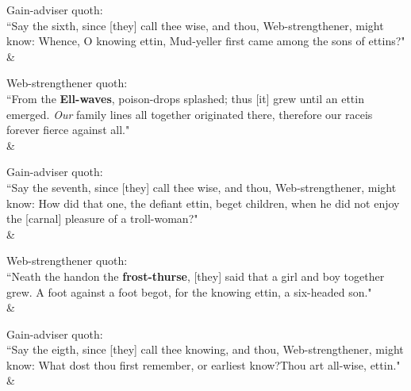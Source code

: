 \begin{Rightside}
\begin{astanza}%
\bv Gain-adviser quoth: \\ “Say the sixth, since [they] call thee wise, and thou, Web-strengthener, might know: Whence, O knowing ettin, Mud-yeller first came among the sons of ettins?" \\
\&\end{astanza}%

\begin{astanza}%
\bv Web-strengthener quoth: \\ “From the \textbf{Ell-waves}, poison-drops splashed; thus [it] grew until an ettin emerged. \emph{Our} family lines all together originated there, therefore our race\footnotemark[45] is forever fierce against all.\footnotemark[46]" \\
\&\end{astanza}%

\begin{astanza}%
\bv Gain-adviser quoth: \\ “Say the seventh, since [they] call thee wise, and thou, Web-strengthener, might know: How did that one, the defiant ettin, beget children, when he did not enjoy the [carnal] pleasure of a troll-woman?" \\
\&\end{astanza}%

\begin{astanza}%
\bv Web-strengthener quoth: \\ “Neath the hand\footnotemark[50] on the \textbf{frost-thurse}, [they] said that a girl and boy together grew. A foot against a foot begot, for the knowing ettin, a six-headed son." \\
\&\end{astanza}%

\begin{astanza}%
\bv Gain-adviser quoth: \\ “Say the eigth, since [they] call thee knowing, and thou, Web-strengthener, might know: What dost thou first remember, or earliest know?\footnotemark[55] Thou art all-wise, ettin." \\
\&\end{astanza}%


\end{Rightside}
